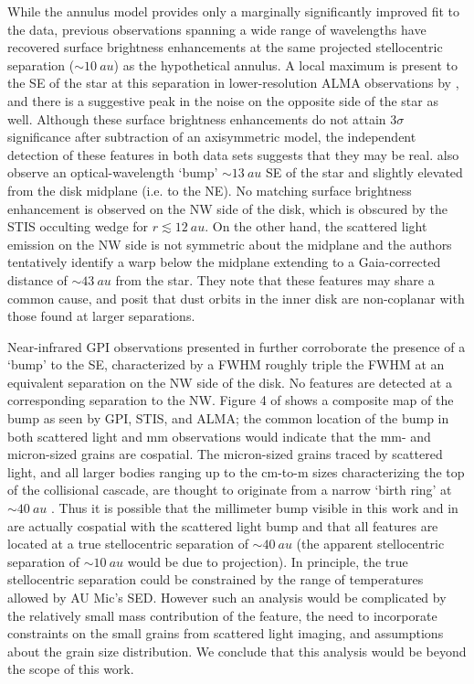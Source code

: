 \documentclass[modern]{aastex62}
\begin{document}
While the annulus model provides only a marginally significantly improved fit to the data, previous observations spanning a wide range of wavelengths have recovered surface brightness enhancements at the same projected stellocentric separation ($\sim \SI{10}{au}$) as the hypothetical annulus.
A local maximum is present to the SE of the star at this separation in lower-resolution ALMA observations by \citet{macgregor13}, and there is a suggestive peak in the noise on the opposite side of the star as well.
Although these surface brightness enhancements do not attain $3 \sigma$ significance after subtraction of an axisymmetric model, the independent detection of these features in both data sets suggests that they may be real.  
\citet{schneider14} also observe an optical-wavelength `bump' $\sim \SI{13}{au}$ SE of the star and slightly elevated from the disk midplane (i.e. to the NE).
No matching surface brightness enhancement is observed on the NW side of the disk, which is obscured by the STIS occulting wedge for $r \lesssim \SI{12}{au}$.
On the other hand, the scattered light emission on the NW side is not symmetric about the midplane and the authors tentatively identify a warp below the midplane extending to a Gaia-corrected distance of $\sim \SI{43}{au}$ from the star.
They note that these features may share a common cause, and posit that dust orbits in the inner disk are non-coplanar with those found at larger separations.

Near-infrared GPI observations presented in \citet{wang15} further corroborate the presence of a `bump' to the SE, characterized by a FWHM roughly triple the FWHM at an equivalent separation on the NW side of the disk. 
No features are detected at a corresponding separation to the NW.
Figure 4 of \citet{wang15} shows a composite map of the bump as seen by GPI, STIS, and ALMA; the common location of the bump in both scattered light and mm observations would indicate that the mm- and micron-sized grains are cospatial.
The micron-sized grains traced by scattered light, and all larger bodies ranging up to the cm-to-m sizes characterizing the top of the collisional cascade, are thought to originate from a narrow `birth ring' at $\sim \SI{40}{au}$ \citep{strubbe&chiang06}. 
Thus it is possible that the millimeter bump visible in this work and in \citet{macgregor13} are actually cospatial with the scattered light bump and that all features are located at a true stellocentric separation of $\sim \SI{40}{au}$ (the apparent stellocentric separation of $\sim \SI{10}{au}$ would be due to projection).
In principle, the true stellocentric separation could be constrained by the range of temperatures allowed by AU Mic's SED. 
However such an analysis would be complicated by the relatively small mass contribution of the feature, the need to incorporate constraints on the small grains from scattered light imaging, and assumptions about the grain size distribution. 
We conclude that this analysis would be beyond the scope of this work.
\end{document}
